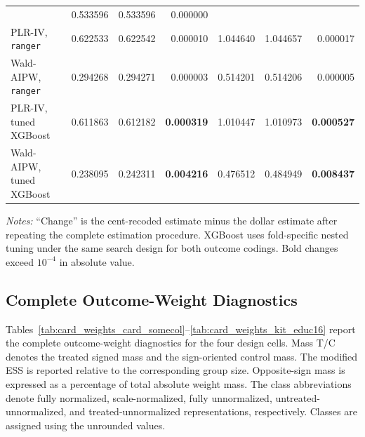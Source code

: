 \documentclass[12pt, a4paper, oneside]{article}
\theoremstyle{plain}
\theoremstyle{definition}
\begin{document}
\begin{table}[H]
\begin{threeparttable}
\begin{tabular}{@{}lrrr rrr@{}}
& 0.533596 & 0.533596 & 0.000000 \\
\addlinespace
PLR-IV, \texttt{ranger}
& 0.622533 & 0.622542 & 0.000010
& 1.044640 & 1.044657 & 0.000017 \\
Wald-AIPW, \texttt{ranger}
& 0.294268 & 0.294271 & 0.000003
& 0.514201 & 0.514206 & 0.000005 \\
\addlinespace
PLR-IV, tuned XGBoost
& 0.611863 & 0.612182 & \textbf{0.000319}
& 1.010447 & 1.010973 & \textbf{0.000527} \\
Wald-AIPW, tuned XGBoost
& 0.238095 & 0.242311 & \textbf{0.004216}
& 0.476512 & 0.484949 & \textbf{0.008437} \\
\bottomrule
\end{tabular}
\begin{tablenotes}
\scriptsize
\item \textit{Notes:} ``Change'' is the cent-recoded estimate minus the
dollar estimate after repeating the complete estimation procedure. XGBoost
uses fold-specific nested tuning under the same search design for both
outcome codings. Bold changes exceed \(10^{-4}\) in absolute value.
\end{tablenotes}
\end{threeparttable}
\end{table}








\subsection{Complete Outcome-Weight Diagnostics}
\label{app:card_weight_diagnostics}

Tables~\ref{tab:card_weights_card_somecol}--\ref{tab:card_weights_kit_educ16}
report the complete outcome-weight diagnostics for the four design cells.
Mass T/C denotes the treated signed mass and the sign-oriented control mass.
The modified ESS is reported relative to the corresponding group size.
Opposite-sign mass is expressed as a percentage of total absolute weight mass.
The class abbreviations denote fully normalized, scale-normalized, fully
unnormalized, untreated-unnormalized, and treated-unnormalized representations,
respectively. Classes are assigned using the unrounded values.
\end{document}
